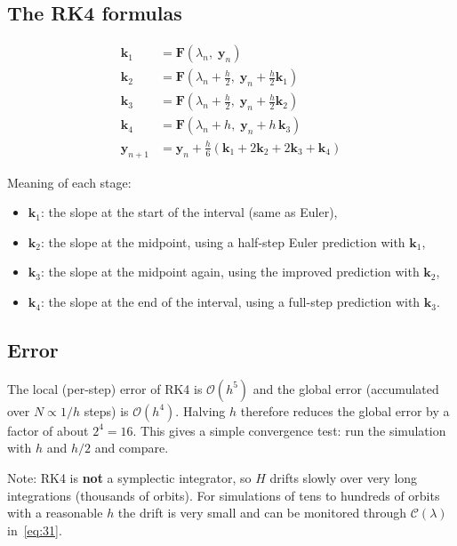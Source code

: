 \documentclass[11pt,a4paper]{article}
\begin{document}
\subsection{The RK4 formulas}

\begin{align*}
    \mathbf{k}_1 &= \mathbf{F}\left(\lambda_n,\; \mathbf{y}_n\right) \tag{34a}\label{eq:34a} \\
    \mathbf{k}_2 &= \mathbf{F}\left(\lambda_n + \tfrac{h}{2},\; \mathbf{y}_n + \tfrac{h}{2}\mathbf{k}_1\right) \tag{34b} \\
    \mathbf{k}_3 &= \mathbf{F}\left(\lambda_n + \tfrac{h}{2},\; \mathbf{y}_n + \tfrac{h}{2}\mathbf{k}_2\right) \tag{34c} \\
    \mathbf{k}_4 &= \mathbf{F}\left(\lambda_n + h,\; \mathbf{y}_n + h\,\mathbf{k}_3\right) \tag{34d} \\[4pt]
    \mathbf{y}_{n+1} &= \mathbf{y}_n + \frac{h}{6}\left( \mathbf{k}_1 + 2\mathbf{k}_2 + 2\mathbf{k}_3 + \mathbf{k}_4 \right) \tag{34e}\label{eq:34e}
\end{align*}

Meaning of each stage:
\begin{itemize}
  \item $\mathbf{k}_1$: the slope at the start of the interval (same as Euler),
  \item $\mathbf{k}_2$: the slope at the midpoint, using a half-step Euler prediction with $\mathbf{k}_1$,
  \item $\mathbf{k}_3$: the slope at the midpoint again, using the improved prediction with $\mathbf{k}_2$,
  \item $\mathbf{k}_4$: the slope at the end of the interval, using a full-step prediction with $\mathbf{k}_3$.
\end{itemize}

\subsection{Error}

The local (per-step) error of RK4 is $\mathcal{O}(h^5)$ and the global error (accumulated over $N \propto 1/h$ steps) is $\mathcal{O}(h^4)$. Halving $h$ therefore reduces the global error by a factor of about $2^4 = 16$. This gives a simple convergence test: run the simulation with $h$ and $h/2$ and compare.

Note: RK4 is \textbf{not} a symplectic integrator, so $H$ drifts slowly over very long integrations (thousands of orbits). For simulations of tens to hundreds of orbits with a reasonable $h$ the drift is very small and can be monitored through $\mathcal{C}(\lambda)$ in~\eqref{eq:31}.
\end{document}
